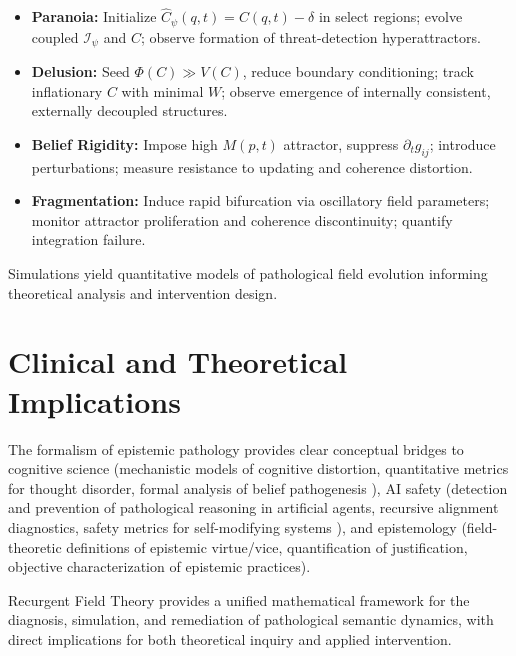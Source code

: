\begin{itemize}

    \item \textbf{Paranoia:} Initialize \(\hat{C}_{\psi}(q,t) = C(q,t) - \delta\) in select regions; evolve coupled \(\mathcal{I}_{\psi}\) and \(C\); observe formation of threat-detection hyperattractors.
    
    \item \textbf{Delusion:} Seed \(\Phi(C) \gg V(C)\), reduce boundary conditioning; track inflationary \(C\) with minimal \(W\); observe emergence of internally consistent, externally decoupled structures.
    
    \item \textbf{Belief Rigidity:} Impose high \(M(p,t)\) attractor, suppress \(\partial_t g_{ij}\); introduce perturbations; measure resistance to updating and coherence distortion.
    
    \item \textbf{Fragmentation:} Induce rapid bifurcation via oscillatory field parameters; monitor attractor proliferation and coherence discontinuity; quantify integration failure.

\end{itemize}

Simulations yield quantitative models of pathological field evolution informing theoretical analysis and intervention design.


\section{Clinical and Theoretical Implications}
\label{16.8:clinical_and_theoretical_implications}

The formalism of epistemic pathology provides clear conceptual bridges to cognitive science (mechanistic models of cognitive distortion, quantitative metrics for thought disorder, formal analysis of belief pathogenesis \autocite{Crick1990, Dehaene2014}), AI safety (detection and prevention of pathological reasoning in artificial agents, recursive alignment diagnostics, safety metrics for self-modifying systems \autocite{RussellDeweyTegmark2016}), and epistemology (field-theoretic definitions of epistemic virtue/vice, quantification of justification, objective characterization of epistemic practices).

Recurgent Field Theory provides a unified mathematical framework for the diagnosis, simulation, and remediation of pathological semantic dynamics, with direct implications for both theoretical inquiry and applied intervention. 